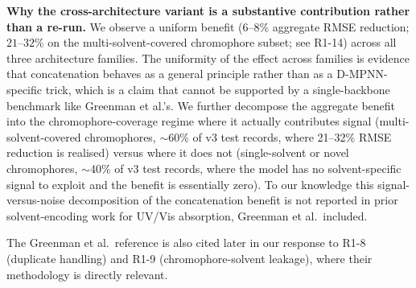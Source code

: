 \documentclass[11pt]{article}
\begin{document}
{\textbf{Why the cross-architecture variant is a substantive contribution rather than a re-run.} We observe a uniform benefit ($6$--$8$\% aggregate RMSE reduction; $21$--$32$\% on the multi-solvent-covered chromophore subset; see R1-14) across all three architecture families. The uniformity of the effect across families is evidence that concatenation behaves as a general principle rather than as a D-MPNN-specific trick, which is a claim that cannot be supported by a single-backbone benchmark like Greenman et al.'s. We further decompose the aggregate benefit into the chromophore-coverage regime where it actually contributes signal (multi-solvent-covered chromophores, $\sim$60\% of v3 test records, where 21--32\% RMSE reduction is realised) versus where it does not (single-solvent or novel chromophores, $\sim$40\% of v3 test records, where the model has no solvent-specific signal to exploit and the benefit is essentially zero). To our knowledge this signal-versus-noise decomposition of the concatenation benefit is not reported in prior solvent-encoding work for UV/Vis absorption, Greenman et al.\ included.

The Greenman et al.\ reference is also cited later in our response to R1-8 (duplicate handling) and R1-9 (chromophore-solvent leakage), where their methodology is directly relevant.}
\end{document}
